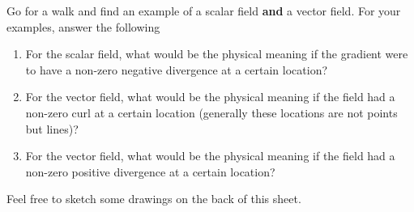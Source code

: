 \documentclass{reflection}
\begin{document}
\maketitle

Go for a walk and find an example of a scalar field \textbf{and} a vector field. For your examples, answer the following
\begin{enumerate}
    \item For the scalar field, what would be the physical meaning if the gradient were to have a non-zero negative divergence at a certain location?
    \item For the vector field, what would be the physical meaning if the field had a non-zero curl at a certain location (generally these locations are not points but lines)?
    \item For the vector field, what would be the physical meaning if the field had a non-zero positive divergence at a certain location?
\end{enumerate}
Feel free to sketch some drawings on the back of this sheet.

\end{document}
